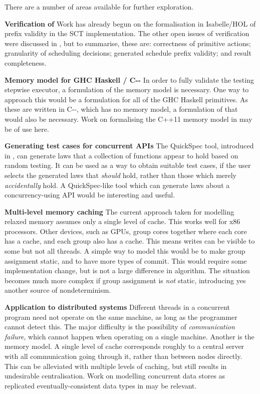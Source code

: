 There are a number of areas available for further exploration. 

\textbf{Verification of \dejafu{}}\hspace{0.3cm} Work has already
begun on the formalisation in Isabelle/HOL of prefix validity in the
SCT implementation. The other open issues of verification were
discussed in , but to summarise, these are:
correctness of primitive actions; granularity of scheduling decisions;
generated schedule prefix validity; and result completeness.

\textbf{Memory model for GHC Haskell / C{-}{-}}\hspace{0.3cm} In order
to fully validate the testing stepwise executor, a formulation of the
memory model is necessary. One way to approach this would be a
formulation for all of the GHC Haskell primitives. As these are
written in C{-}{-}, which has no memory model, a formulation of that
would also be necessary. Work on formalising the C++11 memory model in
\citep{c++11} may be of use here.

\textbf{Generating test cases for concurrent APIs}\hspace{0.3cm} The
QuickSpec tool, introduced in \citep{quickspec}, can generate laws
that a collection of functions appear to hold based on random
testing. It can be used as a way to obtain suitable test cases, if the
user selects the generated laws that \emph{should} hold, rather than
those which merely \emph{accidentally} hold. A QuickSpec-like tool
which can generate laws about a concurrency-using API would be
interesting and useful.

\textbf{Multi-level memory caching}\hspace{0.3cm} The current approach
taken for modelling relaxed memory assumes only a single level of
cache. This works well for x86 processors. Other devices, such as
GPUs, group cores together where each core has a cache, and each group
also has a cache. This means writes can be visible to some but not all
threads. A simple way to model this would be to make group assignment
static, and to have more types of commit. This would require some
implementation change, but is not a large difference in algorithm. The
situation becomes much more complex if group assignment is \emph{not}
static, introducing yes another source of nondeterminism.

\textbf{Application to distributed systems}\hspace{0.3cm} Different
threads in a concurrent program need not operate on the same machine,
as long as the programmer cannot detect this. The major difficulty is
the possibility of \emph{communication failure}, which cannot happen
when operating on a single machine. Another is the memory model. A
single level of cache corresponds roughly to a central server with all
communication going through it, rather than between nodes
directly. This can be alleviated with multiple levels of caching, but
still results in undesirable centralisation. Work on modelling
concurrent data stores as replicated eventually-consistent data types
in \citep{replicated} may be relevant.
